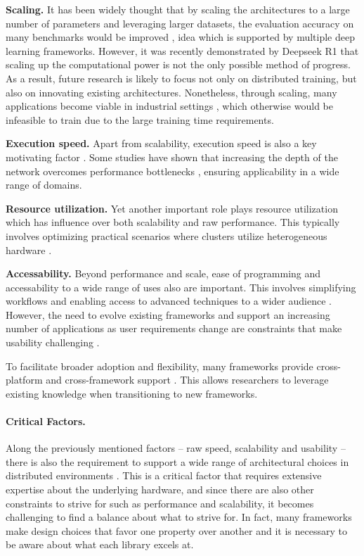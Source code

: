 \textbf{Scaling.}
It has been widely thought that
by scaling the architectures to a large number of parameters and leveraging larger datasets, the
evaluation accuracy on many benchmarks would be improved , idea which
is supported by multiple deep learning frameworks. However, it was recently demonstrated by
Deepseek R1 \cite{deepseekai2025deepseekr1incentivizingreasoningcapability} that scaling up the
computational power is not the only possible method of progress. As a result, future research is
likely to focus not only on distributed training, but also on innovating existing architectures.
Nonetheless, through scaling, many applications become viable in industrial settings
, which otherwise would be infeasible to train due to the large training time
requirements.

\textbf{Execution speed.}
Apart from scalability, execution speed is also a key motivating factor
. Some studies have shown that increasing the depth of the network overcomes
performance bottlenecks , ensuring applicability in a wide range of domains.

\textbf{Resource utilization.}
Yet another important role plays resource utilization which has influence over both scalability and raw
performance. This typically involves optimizing practical scenarios where clusters utilize
heterogeneous hardware .

\textbf{Accessability.}
Beyond performance and scale, ease of programming and accessability to a wide range of uses also
are important. This involves simplifying workflows and enabling access to advanced techniques to a
wider audience . However, the need to evolve existing frameworks and
support an increasing number of applications as user requirements change are constraints that make
usability challenging .

To facilitate broader adoption and flexibility, many frameworks provide cross-platform and
cross-framework support . This allows researchers to leverage existing
knowledge when transitioning to new frameworks.

\paragraph{Critical Factors.}
Along the previously mentioned factors -- raw speed, scalability and usability -- there is also the
requirement to support a wide range of architectural choices in distributed environments
. This is a critical factor that requires extensive expertise about the underlying
hardware, and since there are also other constraints to strive for such as performance and
scalability, it becomes challenging to find a balance about what to strive for. In fact, many
frameworks make design choices that favor one property over another 
and it is necessary to be aware about what each library excels at.

